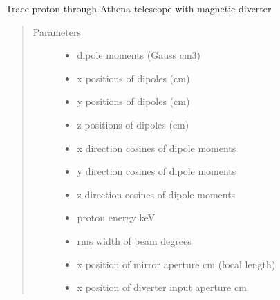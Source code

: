\documentclass[letterpaper,10pt,english]{sphinxmanual}
\begin{document}
\begin{fulllineitems}
\label{\detokenize{xsrt_functions:xsrt.prtathena}}
Trace proton through Athena telescope with magnetic diverter
\begin{quote}\begin{description}
\item[{Parameters}] \leavevmode\begin{itemize}
\item {} 
 \textendash{} dipole moments (Gauss cm3)

\item {} 
 \textendash{} x positions of dipoles (cm)

\item {} 
 \textendash{} y positions of dipoles (cm)

\item {} 
 \textendash{} z positions of dipoles (cm)

\item {} 
 \textendash{} x direction cosines of dipole moments

\item {} 
 \textendash{} y direction cosines of dipole moments

\item {} 
 \textendash{} z direction cosines of dipole moments

\item {} 
 \textendash{} proton energy keV

\item {} 
 \textendash{} rms width of beam degrees

\item {} 
 \textendash{} x position of mirror aperture cm (focal length)

\item {} 
 \textendash{} x position of diverter input aperture cm


\end{itemize}
\end{description}
\end{quote}
\end{fulllineitems}
\end{document}
